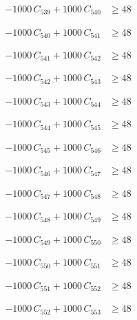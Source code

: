 \documentclass[a4paper,11pt]{article}
\begin{document}
\begin{align}
-1000\,C_{539} + 1000\,C_{540} &\geq 48 \nonumber
\end{align}

\begin{align}
-1000\,C_{540} + 1000\,C_{541} &\geq 48 \nonumber
\end{align}

\begin{align}
-1000\,C_{541} + 1000\,C_{542} &\geq 48 \nonumber
\end{align}

\begin{align}
-1000\,C_{542} + 1000\,C_{543} &\geq 48 \nonumber
\end{align}

\begin{align}
-1000\,C_{543} + 1000\,C_{544} &\geq 48 \nonumber
\end{align}

\begin{align}
-1000\,C_{544} + 1000\,C_{545} &\geq 48 \nonumber
\end{align}

\begin{align}
-1000\,C_{545} + 1000\,C_{546} &\geq 48 \nonumber
\end{align}

\begin{align}
-1000\,C_{546} + 1000\,C_{547} &\geq 48 \nonumber
\end{align}

\begin{align}
-1000\,C_{547} + 1000\,C_{548} &\geq 48 \nonumber
\end{align}

\begin{align}
-1000\,C_{548} + 1000\,C_{549} &\geq 48 \nonumber
\end{align}

\begin{align}
-1000\,C_{549} + 1000\,C_{550} &\geq 48 \nonumber
\end{align}

\begin{align}
-1000\,C_{550} + 1000\,C_{551} &\geq 48 \nonumber
\end{align}

\begin{align}
-1000\,C_{551} + 1000\,C_{552} &\geq 48 \nonumber
\end{align}

\begin{align}
-1000\,C_{552} + 1000\,C_{553} &\geq 48 \nonumber
\end{align}
\end{document}
